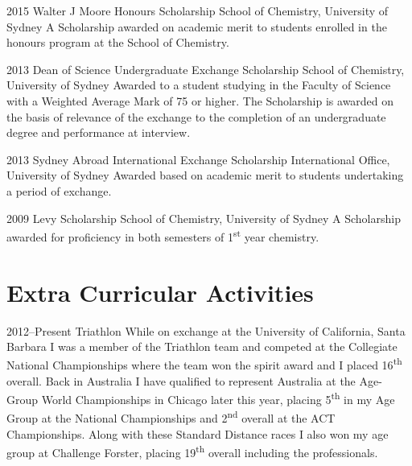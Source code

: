 \documentclass[print]{friggeri-cv} %
\begin{document}
{\begin{entrylist}


\entry
{2015}
{Walter J Moore Honours Scholarship}
{School of Chemistry, University of Sydney}
{A Scholarship awarded on academic merit to students enrolled in the honours program at the School of Chemistry.}

\entry
{2013}
{Dean of Science Undergraduate Exchange Scholarship}
{School of Chemistry, University of Sydney}
{Awarded to a student studying in the Faculty of Science with a Weighted Average Mark of 75 or higher. The Scholarship is awarded on the basis of relevance of the exchange to the completion of an undergraduate degree and performance at interview.}

\entry
{2013}
{Sydney Abroad International Exchange Scholarship}
{International Office, University of Sydney}
{Awarded based on academic merit to students undertaking a period of exchange.}

\entry
{2009}
{Levy Scholarship}
{School of Chemistry, University of Sydney}
{A Scholarship awarded for proficiency in both semesters of 1\textsuperscript{st} year chemistry.}


\end{entrylist}


\section{Extra Curricular Activities}

\begin{entrylist}


\entry
{2012--Present}
{Triathlon}
{}
{While on exchange at the University of California, Santa Barbara I was a member of the Triathlon team and competed at the Collegiate National Championships where the team won the spirit award and I placed 16\textsuperscript{th} overall. Back in Australia I have qualified to represent Australia at the Age-Group World Championships in Chicago later this year, placing 5\textsuperscript{th} in my Age Group at the National Championships and 2\textsuperscript{nd} overall at the ACT Championships. Along with these Standard Distance races I also won my age group at Challenge Forster, placing 19\textsuperscript{th} overall including the professionals.}


\end{entrylist}}
\end{document}
